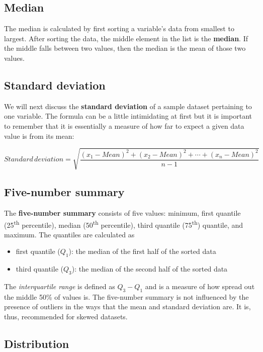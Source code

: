 \documentclass[12pt,]{krantz}
\providecommand{\tightlist}{%
  \setlength{\itemsep}{0pt}\setlength{\parskip}{0pt}}
\theoremstyle{definition}
\theoremstyle{definition}
\theoremstyle{definition}
\theoremstyle{remark}
\begin{document}
\subsection{Median}\label{median}

The median is calculated by first sorting a variable's data from
smallest to largest. After sorting the data, the middle element in the
list is the \textbf{median}. If the middle falls between two values,
then the median is the mean of those two values.

\subsection{Standard deviation}\label{standard-deviation}

We will next discuss the \textbf{standard deviation} of a sample dataset
pertaining to one variable. The formula can be a little intimidating at
first but it is important to remember that it is essentially a measure
of how far to expect a given data value is from its mean:

\[Standard \, deviation = \sqrt{\frac{(x_1 - Mean)^2 + (x_2 - Mean)^2 + \cdots + (x_n - Mean)^2}{n - 1}}\]

\subsection{Five-number summary}\label{five-number-summary}

The \textbf{five-number summary} consists of five values: minimum, first
quantile (25\textsuperscript{th} percentile), median
(50\textsuperscript{th} percentile), third quantile
(75\textsuperscript{th}) quantile, and maximum. The quantiles are
calculated as

\begin{itemize}
\tightlist
\item
  first quantile (\(Q_1\)): the median of the first half of the sorted
  data
\item
  third quantile (\(Q_3\)): the median of the second half of the sorted
  data
\end{itemize}

The \emph{interquartile range} is defined as \(Q_3 - Q_1\) and is a
measure of how spread out the middle 50\% of values is. The five-number
summary is not influenced by the presence of outliers in the ways that
the mean and standard deviation are. It is, thus, recommended for skewed
datasets.

\subsection{Distribution}\label{distribution}
\end{document}
